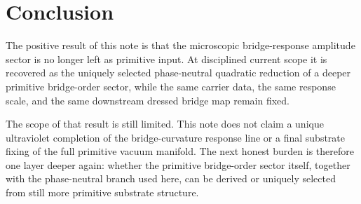 \documentclass[11pt]{article}
\begin{document}
\section{Conclusion}

The positive result of this note is that the microscopic bridge-response amplitude sector is no longer left as primitive input. At disciplined current scope it is recovered as the uniquely selected phase-neutral quadratic reduction of a deeper primitive bridge-order sector, while the same carrier data, the same response scale, and the same downstream dressed bridge map remain fixed.

The scope of that result is still limited. This note does not claim a unique ultraviolet completion of the bridge-curvature response line or a final substrate fixing of the full primitive vacuum manifold. The next honest burden is therefore one layer deeper again: whether the primitive bridge-order sector itself, together with the phase-neutral branch used here, can be derived or uniquely selected from still more primitive substrate structure.
\end{document}
